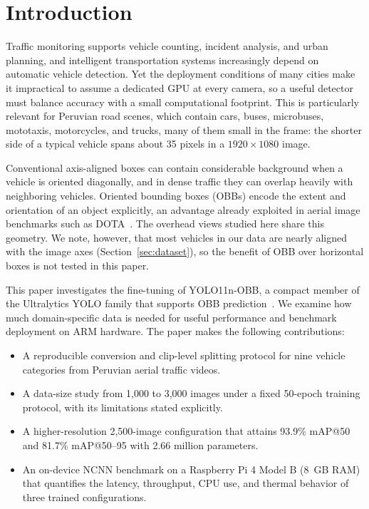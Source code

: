 \documentclass[runningheads]{llncs}
\begin{document}
\section{Introduction}

Traffic monitoring supports vehicle counting, incident analysis, and urban
planning, and intelligent transportation systems increasingly depend on
automatic vehicle detection. Yet the deployment conditions of many cities make
it impractical to assume a dedicated GPU at every camera, so a useful detector
must balance accuracy with a small computational footprint. This is
particularly relevant for Peruvian road scenes, which contain cars, buses,
microbuses, mototaxis, motorcycles, and trucks, many of them small in the
frame: the shorter side of a typical vehicle spans about 35 pixels in a
$1920\times1080$ image.

Conventional axis-aligned boxes can contain considerable background when a
vehicle is oriented diagonally, and in dense traffic they can overlap heavily
with neighboring vehicles. Oriented bounding boxes (OBBs) encode the extent and
orientation of an object explicitly, an advantage already exploited in aerial
image benchmarks such as DOTA~\cite{xia2018dota,ding2022dota}. The overhead
views studied here share this geometry. We note, however, that most vehicles in
our data are nearly aligned with the image axes (Section~\ref{sec:dataset}), so
the benefit of OBB over horizontal boxes is not tested in this paper.

This paper investigates the fine-tuning of YOLO11n-OBB, a compact member of the
Ultralytics YOLO family that supports OBB prediction~\cite{ultralytics_yolo11,ultralytics_obb}.
We examine how much domain-specific data is needed for useful performance and
benchmark deployment on ARM hardware. The paper makes the following
contributions:

\begin{itemize}
\item A reproducible conversion and clip-level splitting protocol for nine
vehicle categories from Peruvian aerial traffic videos.
\item A data-size study from 1,000 to 3,000 images under a fixed 50-epoch
training protocol, with its limitations stated explicitly.
\item A higher-resolution 2,500-image configuration that attains 93.9\%
mAP@50 and 81.7\% mAP@50--95 with 2.66 million parameters.
\item An on-device NCNN benchmark on a Raspberry Pi 4 Model B (8~GB RAM) that
quantifies the latency, throughput, CPU use, and thermal behavior of three
trained configurations.
\end{itemize}
\end{document}
